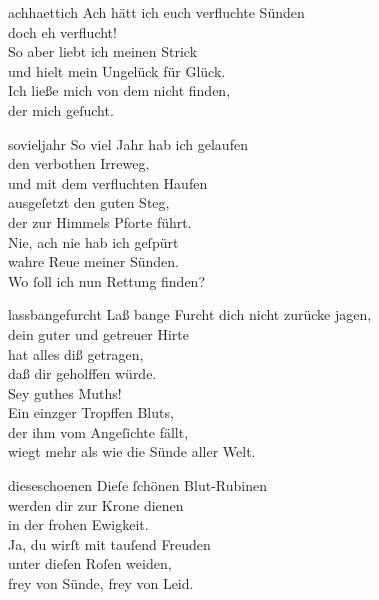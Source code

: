 \documentclass[tocstyle=ref-genre]{ees}
\begin{document}
{\begin{movement}{achhaettich}
  Ach hätt ich euch verfluchte Sünden\\
  doch eh verflucht!\\
  So aber liebt ich meinen Strick\\
  und hielt mein Ungelück für Glück.\\
  Ich ließe mich von dem nicht finden,\\
  der mich geſucht.
\end{movement}

\begin{movement}{sovieljahr}
  \voice[Coro]
  So viel Jahr hab ich gelaufen\\
  den verbothen Irreweg,\\
  und mit dem verfluchten Haufen\\
  ausgeſetzt den guten Steg,\\
  der zur Himmels Pforte führt.\\
  Nie, ach nie hab ich geſpürt\\
  wahre Reue meiner Sünden.\\
  Wo ſoll ich nun Rettung finden?
\end{movement}

\begin{movement}{lassbangefurcht}
  Laß bange Furcht dich nicht zurücke jagen,\\
  dein guter und getreuer Hirte\\
  hat alles diß getragen,\\
  daß dir geholffen würde.\\
  Sey guthes Muths!\\
  Ein einzger Tropffen Bluts,\\
  der ihm vom Angeſichte fällt,\\
  wiegt mehr als wie die Sünde aller Welt.
\end{movement}

\enlargethispage\baselineskip
\begin{movement}{dieseschoenen}
  Dieſe ſchönen Blut-Rubinen\\
  werden dir zur Krone dienen\\
  in der frohen Ewigkeit.\\
  Ja, du wirſt mit tauſend Freuden\\
  unter dieſen Roſen weiden,\\
  frey von Sünde, frey von Leid.
\end{movement}

}
\end{document}
